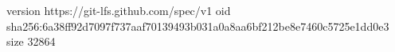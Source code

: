 version https://git-lfs.github.com/spec/v1
oid sha256:6a38ff92d7097f737aaf70139493b031a0a8aa6bf212be8e7460c5725e1dd0e3
size 32864
